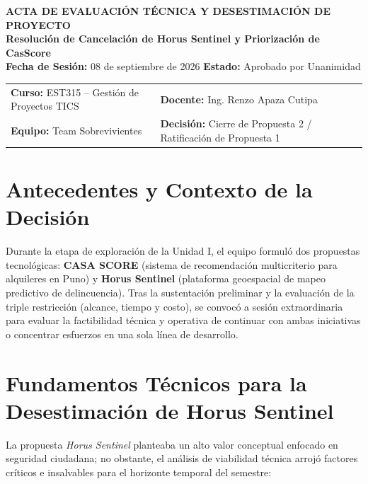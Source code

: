 \documentclass[11pt,a4paper]{article}
\begin{document}

\begin{center}
    {\Large \textbf{\textcolor{AzulUNA}{ACTA DE EVALUACIÓN TÉCNICA Y DESESTIMACIÓN DE PROYECTO}}}\\[3pt]
    {\normalsize \textbf{Resolución de Cancelación de Horus Sentinel y Priorización de CasScore}}\\[4pt]
    \footnotesize \textbf{Fecha de Sesión:} 08 de septiembre de 2026 \quad \textbar\quad \textbf{Estado:} Aprobado por Unanimidad
\end{center}

\vspace{0.1cm}

\noindent\begin{tabularx}{\textwidth}{@{}llXX@{}}
\toprule
\textbf{Curso:} EST315 -- Gestión de Proyectos TICS & \textbf{Docente:} Ing. Renzo Apaza Cutipa \\
\textbf{Equipo:} Team Sobrevivientes & \textbf{Decisión:} Cierre de Propuesta 2 / Ratificación de Propuesta 1 \\
\bottomrule
\end{tabularx}

\vspace{0.2cm}

\section{Antecedentes y Contexto de la Decisión}
Durante la etapa de exploración de la Unidad I, el equipo formuló dos propuestas tecnológicas: \textbf{CASA SCORE} (sistema de recomendación multicriterio para alquileres en Puno) y \textbf{Horus Sentinel} (plataforma geoespacial de mapeo predictivo de delincuencia). Tras la sustentación preliminar y la evaluación de la triple restricción (alcance, tiempo y costo), se convocó a sesión extraordinaria para evaluar la factibilidad técnica y operativa de continuar con ambas iniciativas o concentrar esfuerzos en una sola línea de desarrollo.

\section{Fundamentos Técnicos para la Desestimación de Horus Sentinel}
La propuesta \textit{Horus Sentinel} planteaba un alto valor conceptual enfocado en seguridad ciudadana; no obstante, el análisis de viabilidad técnica arrojó factores críticos e insalvables para el horizonte temporal del semestre:
\end{document}

